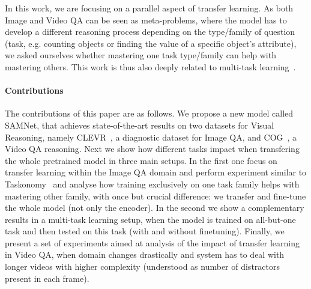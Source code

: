 In this work, we are focusing on a parallel aspect of transfer learning. As both Image and Video QA can be seen as meta-problems, where the model has to develop a different reasoning process depending on the type/family of question (task, e.g. counting objects or finding the value of a specific object's attribute), we asked ourselves whether mastering one task type/family can help with mastering others. This work is thus also deeply related to multi-task learning~\cite{caruana1997multitask}.

\paragraph{Contributions}

The contributions of this paper are as follows.
We propose a new model called SAMNet, that achieves state-of-the-art results on two datasets for Visual Reasoning, namely CLEVR~\cite{johnson2017clevr}, a diagnostic dataset for Image QA, and COG~\cite{yang2018dataset}, a Video QA reasoning.
Next we show how different tasks impact when transfering the whole pretrained model in three main setups.
In the first one focus on transfer learning within the Image QA domain and perform experiment similar to Taskonomy~\cite{zamir2018taskonomy} and analyse how training exclusively on one task family helps with mastering other family, with once but crucial difference: we transfer and fine-tune the whole model (not only the encoder).
In the second we show a complementary results in a multi-task learning setup, when the model is trained on all-but-one task and then tested on this task (with and without finetuning).
Finally, we present a set of experiments aimed at analysis of the impact of transfer learning in Video QA, when domain changes drastically and system has to deal with longer videos with higher complexity (understood as number of distractors present in each frame).


 

